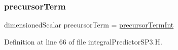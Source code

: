 \mbox{\label{integralPredictorSP3_8H_a036c76c07f219017fb5141b4e0bdc0d7}} 
\subsubsection{\texorpdfstring{precursor\+Term}{precursorTerm}}
{\footnotesize\ttfamily dimensioned\+Scalar precursor\+Term = \hyperlink{integralPredictorSP3_8H_a6f122f03262179afd60cc84232ee4bf9}{precursor\+Term\+Int}}



Definition at line 66 of file integral\+Predictor\+S\+P3.\+H.

